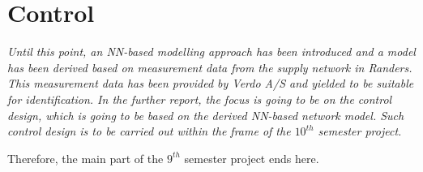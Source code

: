 \chapter{Control}
\label{unspecified}

\emph{Until this point, an NN-based modelling approach has been introduced and a model has been derived based on measurement data from the supply network in Randers. This measurement data has been provided by Verdo A/S and yielded to be suitable for identification. In the further report, the focus is going to be on the control design, which is going to be based on the derived NN-based network model. Such control design is to be carried out within the frame of the $10^{th}$ semester project.}

Therefore, the main part of the $9^{th}$ semester project ends here. 